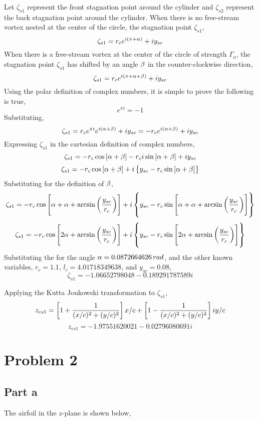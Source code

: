 \documentclass[class=report, 12pt, crop=false]{standalone}
\begin{document}
\begin{center}
Let $\zeta_{s1}$ represent the front stagnation point around the cylinder and $\zeta_{s2}$ represent the back stagnation point around the cylinder. When there is no free-stream vortex nested at the center of the circle, the stagnation point $\zeta_{s1}$,
$$\zeta_{s1} = r_ce^{i(\pi+\alpha)} + iy_{sc}$$
When there is a free-stream vortex at the center of the circle of strength $\Gamma_a$, the stagnation point $\zeta_{s1}$ has shifted by an angle $\beta$ in the counter-clockwise direction,
$$\zeta_{s1} = r_ce^{i(\pi+\alpha+\beta)} + iy_{sc}$$
Using the polar definition of complex numbers, it is simple to prove the following is true,
$$e^{\pi i} = -1$$
Substituting,
$$\zeta_{s1} = r_ce^{\pi i}e^{i(\alpha+\beta)} + iy_{sc} = -r_ce^{i(\alpha+\beta)} + iy_{sc}$$
Expressing $\zeta_{s1}$ in the cartesian definition of complex numbers,
$$\zeta_{s1} = -r_c\cos\left[\alpha+\beta\right] - r_ci\sin\left[\alpha+\beta\right] + iy_{sc}$$
$$\zeta_{s1} = -r_c\cos\left[\alpha+\beta\right] + i\left\{y_{sc} - r_c\sin\left[\alpha+\beta\right]\right\}$$
Substituting for the definition of $\beta$,
$$\zeta_{s1} = -r_c\cos\left[\alpha+\alpha + \arcsin\left(\frac{y_{sc}}{r_c}\right)\right] + i\left\{y_{sc} - r_c\sin\left[\alpha+\alpha + \arcsin\left(\frac{y_{sc}}{r_c}\right)\right]\right\}$$
$$\zeta_{s1} = -r_c\cos\left[2\alpha + \arcsin\left(\frac{y_{sc}}{r_c}\right)\right] + i\left\{y_{sc} - r_c\sin\left[2\alpha + \arcsin\left(\frac{y_{sc}}{r_c}\right)\right]\right\}$$
Substituting the for the angle $\alpha=0.0872664626\,rad$, and the other known variables, $r_c=1.1$, $l_c=4.01718349638$, and $y_{sc}=0.08$,
$$\zeta_{s1} = -1.06652798048 - 0.189291787589i$$

Applying the Kutta Joukowski transformation to $\zeta_{s1}$,
$$z_{cs1} = \left[1+\frac{1}{(x/c)^2+(y/c)^2}\right]x/c + \left[1-\frac{1}{(x/c)^2+(y/c)^2}\right]iy/c$$
$$z_{cs1} = -1.97551620021 - 0.02796080691i$$

\section{Problem 2}
\begin{comment}
\end{comment}
\subsection{Part a}
The airfoil in the $z$-plane is shown below,

\end{center}
\end{document}
